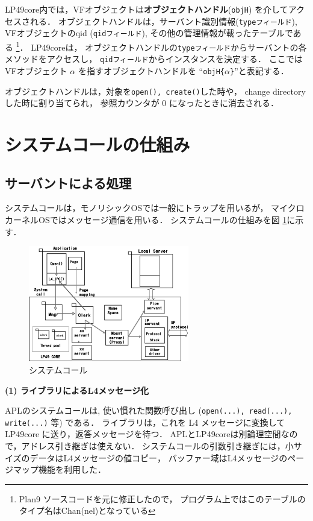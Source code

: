 \documentclass{ieicej}
\begin{document}
  LP49core内では，VFオブジェクトは{\bf オブジェクトハンドル}({\tt objH})
を介してアクセスされる．
オブジェクトハンドルは，サーバント識別情報({\tt typeフィールド}), 
VFオブジェクトのqid ({\tt qidフィールド}), 
その他の管理情報が載ったテーブルである
\footnote{ Plan9 ソースコードを元に修正したので，
プログラム上ではこのテーブルのタイプ名はChan(nel)となっている}．
LP49coreは，
オブジェクトハンドルの{\tt typeフィールド}からサーバントの各メソッドをアクセスし，
{\tt qidフィールド}からインスタンスを決定する．
%
ここではVFオブジェクト $\alpha$ を指すオブジェクトハンドルを
``{\tt objH\{$\alpha$\}}''と表記する．

オブジェクトハンドルは，対象を{\tt open(), create()}した時や，
change directory した時に割り当てられ，
参照カウンタが 0 になったときに消去される．



\section{システムコールの仕組み}

\subsection{サーバントによる処理}

  システムコールは，モノリシックOSでは一般にトラップを用いるが，
マイクロカーネルOSではメッセージ通信を用いる．
システムコールの仕組みを図 \ref{fig:LP49syscall}に示す．

\begin{figure}[tb]
  \begin{center}
   \includegraphics[width=70mm]{../fig/LP49syscall.eps}
    \caption{システムコール}
    \label{fig:LP49syscall}
  \end{center}
\end{figure}

{\bf (1) ライブラリによるL4メッセージ化}

  APLのシステムコールは, 使い慣れた関数呼び出し ({\tt open(...), read(...), write(...)} 等) 
  である．
  ライブラリは，これを L4 メッセージに変換して LP49core に送り，返答メッセージを待つ．
  APLとLP49coreは別論理空間なので，アドレス引き継ぎは使えない．
  システムコールの引数引き継ぎには，小サイズのデータはL4メッセージの値コピー，
  バッファー域はL4メッセージのページマップ機能を利用した．
\end{document}

